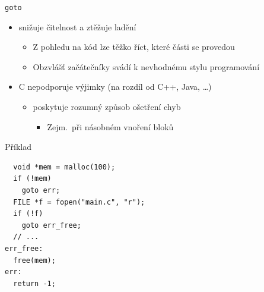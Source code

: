 \begin{frame}[fragile]{\texttt{goto}}

  \begin{itemize}
    \item {} snižuje čitelnost a ztěžuje ladění
    \begin{itemize}
      \item Z pohledu na kód lze těžko říct, které části se provedou
      \item Obzvlášť začátečníky svádí k nevhodnému stylu programování
    \end{itemize}

    \pause

    \item C nepodporuje výjimky (na rozdíl od C++, Java, \dots)
    \begin{itemize}
      \item {} poskytuje rozumný způsob ošetření chyb
      \begin{itemize}
	\item Zejm.\ při násobném vnoření bloků
      \end{itemize}
    \end{itemize}

  \end{itemize}

\begin{block}{Příklad}
\begin{lstlisting}
  void *mem = malloc(100);
  if (!mem)
    goto err;
  FILE *f = fopen("main.c", "r");
  if (!f)
    goto err_free;
  // ...
err_free:
  free(mem);
err:
  return -1;
\end{lstlisting}
\end{block}

\end{frame}

